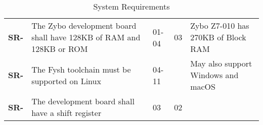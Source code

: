 \resetfyshcounter
\newcommand{\sr}[4]{
	\textbf{SR-\rc} & #1 & #2 & #3 & #4 \\
	\hline
}
\begin{table}[H]
	\begin{tabularx}{\textwidth}{| a | x | a | a | a |}
		\hline

		 &  %
		           &                           %
		           &                           %
		           &                           \\
		\hline
		\sr{The Zybo development board shall have 128KB of RAM and 128KB or ROM}%
		{01-04}%
		{03}%
		{Zybo Z7-010 has 270KB of Block RAM} %

		\sr{The Fysh toolchain must be supported on Linux}%
		{04-11}%
		{}%
		{May also support Windows and macOS}

		\sr{The development board shall have a shift register}%
		{03}%
		{02}%
		{}
	\end{tabularx}
	\caption{System Requirements}
\end{table}

